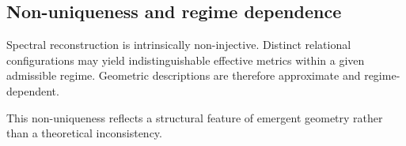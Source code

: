 \subsection{Non-uniqueness and regime dependence}
  \label{subsec:non-uniqueness-and-regime-dependence}

  Spectral reconstruction is intrinsically non-injective.
  Distinct relational configurations may yield indistinguishable
  effective metrics within a given admissible regime.
  Geometric descriptions are therefore approximate and
  regime-dependent.

  This non-uniqueness reflects a structural feature
  of emergent geometry rather than a theoretical inconsistency.
